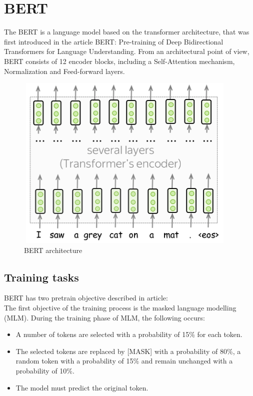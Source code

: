 \documentclass[PMI,VKR]{HSEUniversity}
\begin{document}
\section{BERT}

The BERT is a language model based on the transformer architecture, that was first introduced in the article BERT: Pre-training of Deep Bidirectional Transformers for Language Understanding\cite{bert:2018}.  
From an architectural point of view, BERT consists of 12 encoder blocks, including a Self-Attention mechanism, Normalization and Feed-forward layers.

\begin{figure}[h]
    \centering
    \includegraphics[scale=0.8]{img/bert.png}
    \caption{BERT architecture}
\end{figure}


\subsection[short]{Training tasks}
BERT has two pretrain objective described in article: \\
The first objective of the training process is the masked language modelling (MLM). 
During the training phase of MLM, the following occurs:

\begin{itemize}
    \item A number of tokens are selected with a probability of 15\% for each token.
    \item The selected tokens are replaced by [MASK] with a probability of 80\%, a random token with a probability of 15\% and remain unchanged with a probability of 10\%.
    \item The model must predict the original token.
\end{itemize}
\end{document}
